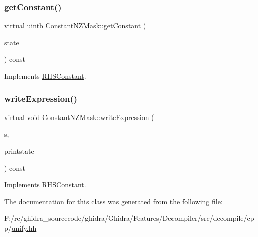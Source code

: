 \subsubsection{\texorpdfstring{getConstant()}{getConstant()}}
{\footnotesize\ttfamily virtual \mbox{\hyperlink{types_8h_a2db313c5d32a12b01d26ac9b3bca178f}{uintb}} Constant\+N\+Z\+Mask\+::get\+Constant (\begin{DoxyParamCaption}\item[{\mbox{\hyperlink{class_unify_state}{Unify\+State}} \&}]{state }\end{DoxyParamCaption}) const\hspace{0.3cm}{\ttfamily [virtual]}}



Implements \mbox{\hyperlink{class_r_h_s_constant_a941b5d2898cbce985a3ef9c5db6fa458}{R\+H\+S\+Constant}}.

\mbox{\label{class_constant_n_z_mask_a6a9514b0783ac757d8b25c93d543407e}} 
\subsubsection{\texorpdfstring{writeExpression()}{writeExpression()}}
{\footnotesize\ttfamily virtual void Constant\+N\+Z\+Mask\+::write\+Expression (\begin{DoxyParamCaption}\item[{ostream \&}]{s,  }\item[{\mbox{\hyperlink{class_unify_c_printer}{Unify\+C\+Printer}} \&}]{printstate }\end{DoxyParamCaption}) const\hspace{0.3cm}{\ttfamily [virtual]}}



Implements \mbox{\hyperlink{class_r_h_s_constant_a79e03c6da5320e24873a4fee25f91411}{R\+H\+S\+Constant}}.



The documentation for this class was generated from the following file\+:\begin{DoxyCompactItemize}
\item 
F\+:/re/ghidra\+\_\+sourcecode/ghidra/\+Ghidra/\+Features/\+Decompiler/src/decompile/cpp/\mbox{\hyperlink{unify_8hh}{unify.\+hh}}\end{DoxyCompactItemize}
